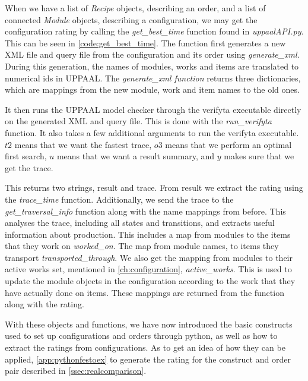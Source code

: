  

When we have a list of \textit{Recipe} objects, describing an order, and a list of connected \textit{Module} objects, describing a configuration, we may get the configuration rating by calling the \textit{get\_best\_time} function found in \textit{uppaalAPI.py}. This can be seen in \cref{code:get_best_time}. The function first generates a new XML file and query file from the configuration and its order using \textit{generate\_xml}. During this generation, the names of modules, works and items are translated to numerical ids in UPPAAL. The \textit{generate\_xml function} returns three dictionaries, which are mappings from the new module, work and item names to the old ones.   

It then runs the UPPAAL model checker through the verifyta executable directly on the generated XML and query file. This is done with the \textit{run\_verifyta} function. It also takes a few additional arguments to run the verifyta executable. $t2$ means that we want the fastest trace, $o3$ means that we perform an optimal first search, $u$ means that we want a result summary, and $y$ makes sure that we get the trace.

This returns two strings, result and trace. From result we extract the rating using the \textit{trace\_time} function. Additionally, we send the trace to the \textit{get\_traversal\_info} function along with the name mappings from before. This analyses the trace, including all states and transitions, and extracts useful information about production. This includes a map from modules to the items that they work on \textit{worked\_on}. The map from module names, to items they transport \textit{transported\_through}. We also get the mapping from modules to their active works set, mentioned in \cref{ch:configuration}, \textit{active\_works}. This is used to update the module objects in the configuration according to the work that they have actually done on items. These mappings are returned from the function along with the rating.

\begin{minipage}{\linewidth}
  
\end{minipage}

With these objects and functions, we have now introduced the basic constructs used to set up configurations and orders through python, as well as how to extract the ratings from configurations. As to get an idea of how they can be applied, \cref{app:pythonfestoex} to generate the rating for the construct and order pair described in \cref{ssec:realcomparison}.